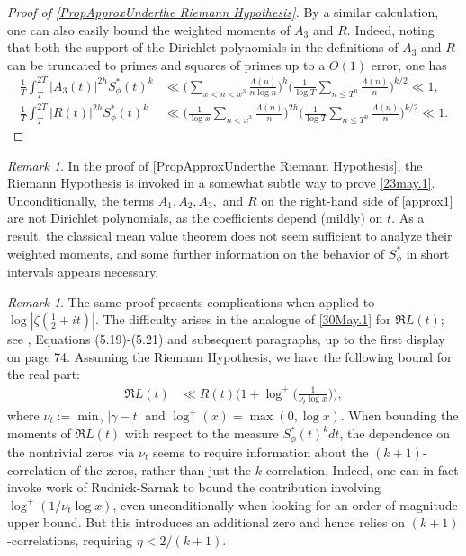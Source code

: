 \documentclass[12pt,oneside,english,a4paper]{amsart}
\theoremstyle{remark}
\newtheorem{rem}[thm]{Remark}
\numberwithin{equation}{section}
\newcommand{\Starphi}{S_\phi^*}
\begin{document}
\begin{proof}[Proof of \cref{PropApproxUnderthe Riemann Hypothesis}]
    By a similar calculation, one can also easily bound the weighted moments of $A_3$ and $R$. Indeed, noting that both the support of the Dirichlet polynomials in the definitions of $A_3$ and $R$ can be truncated to primes and squares of primes up to a $O(1)$ error, one has
    \begin{equation*}\begin{split}
        \frac{1}{T}\int_T^{2T} |A_3(t)|^{2h} \Starphi(t)^k &\ll  \bigg( \sum_{x<n<x^3} \frac{\Lambda(n)}{n\log n} \bigg)^h \bigg( \frac{1}{\log T} \sum_{n\leq T^\eta} \frac{\Lambda(n)}{n} \bigg)^{k/2} \ll 1, \\
        \frac{1}{T}\int_T^{2T} |R(t)|^{2h} \Starphi(t)^k &\ll \bigg( \frac{1}{\log x} \sum_{n<x^3} \frac{\Lambda(n)}{n} \bigg)^{2h} \bigg(\frac{1}{\log T} \sum_{n\leq T^\eta} \frac{\Lambda(n)}{n} \bigg)^{k/2} \ll 1.
    \end{split}\end{equation*}
\end{proof}

\begin{rem}
    In the proof of \cref{PropApproxUnderthe Riemann Hypothesis}, the Riemann Hypothesis is invoked in a somewhat subtle way to prove \eqref{23may.1}. Unconditionally, the terms $A_1,A_2,A_3,$ and $R$ on the right-hand side of \eqref{approx1} are not Dirichlet polynomials, as the coefficients depend (mildly) on $t$. As a result, the classical mean value theorem does not seem sufficient to analyze their weighted moments, and some further information on the behavior of $\Starphi$ in short intervals appears necessary.
\end{rem}

\begin{rem}\label{RemarkImvsRe}
    The same proof presents complications when applied to $\log|\zeta(\frac12+it)|$. The difficulty arises in the analogue of \eqref{30May.1} for $\Re L(t)$; see \cite{Tsang1}, Equations (5.19)-(5.21) and subsequent paragraphs, up to the first display on page 74. Assuming the Riemann Hypothesis, we have the following bound for the real part:
    \begin{align*}
        \Re L(t) &\ll R(t)\bigg( 1 + \log^+\bigg(\frac{1}{\nu_t\log x}\bigg)\bigg),
    \end{align*}
    where $\nu_t:= \min_\gamma|\gamma-t|$ and $\log^+(x)=\max(0,\log x)$. When bounding the moments of $\Re L(t)$ with respect to the measure $\Starphi(t)^k dt$, the dependence on the nontrivial zeros via $\nu_t$ seems to require information about the $(k+1)$-correlation of the zeros, rather than just the $k$-correlation. Indeed, one can in fact invoke work of Rudnick-Sarnak \cite{RudnickSarnak} to bound the contribution involving $\log^+(1/\nu_t \log x)$, even unconditionally when looking for an order of magnitude upper bound. But this introduces an additional zero and hence relies on $(k+1)$-correlations, requiring $\eta < 2/(k+1)$.
\end{rem}
\end{document}
